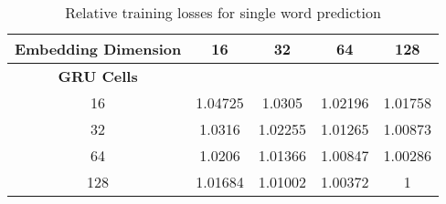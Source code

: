   \begin{table}[htpb]
    \centering
    \label{tab:single}
    \begin{tabular}{| c | c | c | c | c |}
      \hline \textbf{Embedding Dimension}  & 16  & 32  & 64 & 128 \\ \hline
      \textbf{GRU Cells} &  & & & \\
      16 & \cellcolor[rgb]{0.9,0.6,0}1.04725 & \cellcolor[rgb]{0.8,0.65,0}  1.0305 & \cellcolor[rgb]{0.75,0.7,0}  1.02196 & \cellcolor[rgb]{0.7,0.75,0}  1.01758 \\ \hline
      32 & \cellcolor[rgb]{0.85,0.65,0} 1.0316 &\cellcolor[rgb]{0.8,0.7,0} 1.02255 &\cellcolor[rgb]{0.65,0.85,0}  1.01265 & \cellcolor[rgb]{0.6,0.9,0} 1.00873 \\ \hline
      64 &\cellcolor[rgb]{0.75,0.75,0}  1.0206 &\cellcolor[rgb]{0.65,0.8,0}  1.01366 & \cellcolor[rgb]{0.55,0.9,0} 1.00847 & \cellcolor[rgb]{0.5,0.95,0} 1.00286 \\ \hline
      128 &\cellcolor[rgb]{0.7,0.8,0}  1.01684 &\cellcolor[rgb]{0.6,0.85,0}  1.01002 & \cellcolor[rgb]{0.55,0.95,0} 1.00372 & \cellcolor[rgb]{0.5,1,0} 1 \\ \hline
    \end{tabular}
    \caption{Relative training losses for single word prediction}
  \end{table}
